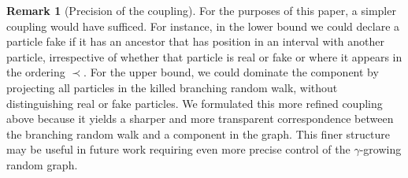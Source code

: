 \documentclass[a4paper, a4wide, 10pt, reqno]{amsart}
\theoremstyle{plain}
\theoremstyle{definition}
\newtheorem{remark}[theorem]{Remark}
\numberwithin{equation}{section}
\begin{document}
\begin{remark}[Precision of the coupling]
For the purposes of this paper, a simpler coupling would have sufficed. For instance, in the lower bound we could declare a particle fake if it has an ancestor that has position in an interval with another particle, irrespective of whether that particle is real or fake or where it appears in the ordering $\prec$. For the upper bound, we could dominate the component by projecting all particles in the killed branching random walk, without distinguishing real or fake particles. 
We formulated this more refined coupling above because it yields a sharper and more transparent correspondence between the branching random walk and a component in the graph. This finer structure may be useful in future work requiring even more precise control of the $\gamma$-growing random graph.    
\end{remark}
\end{document}
